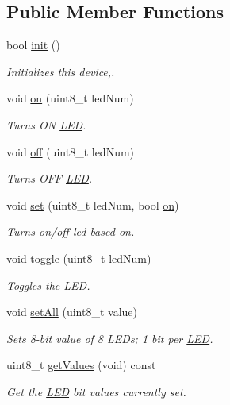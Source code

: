 \subsection*{Public Member Functions}
\begin{DoxyCompactItemize}
\item 
bool \hyperlink{classLED_a63962161aba1782dd879760c5960d6b5}{init} ()
\begin{DoxyCompactList}\small\item\em Initializes this device,. \end{DoxyCompactList}\item 
void \hyperlink{classLED_acc39ccc6387373b840912f21d62dc876}{on} (uint8\+\_\+t led\+Num)
\begin{DoxyCompactList}\small\item\em Turns ON \hyperlink{classLED}{L\+ED}. \end{DoxyCompactList}\item 
void \hyperlink{classLED_addf41e0b79325809d8cc12b792aaae97}{off} (uint8\+\_\+t led\+Num)
\begin{DoxyCompactList}\small\item\em Turns O\+FF \hyperlink{classLED}{L\+ED}. \end{DoxyCompactList}\item 
void \hyperlink{classLED_a31971293aa8763338871c9b2789cb606}{set} (uint8\+\_\+t led\+Num, bool \hyperlink{classLED_acc39ccc6387373b840912f21d62dc876}{on})
\begin{DoxyCompactList}\small\item\em Turns on/off led based on. \end{DoxyCompactList}\item 
void \hyperlink{classLED_aaf40ad52100d7bebb418a2b48bd5a5bf}{toggle} (uint8\+\_\+t led\+Num)
\begin{DoxyCompactList}\small\item\em Toggles the \hyperlink{classLED}{L\+ED}. \end{DoxyCompactList}\item 
void \hyperlink{classLED_a227f3bc652bf914afdeb3cbb73d1b927}{set\+All} (uint8\+\_\+t value)
\begin{DoxyCompactList}\small\item\em Sets 8-\/bit value of 8 L\+E\+Ds; 1 bit per \hyperlink{classLED}{L\+ED}. \end{DoxyCompactList}\item 
uint8\+\_\+t \hyperlink{classLED_a55aa5615bfa11cf5f127a08565a86796}{get\+Values} (void) const 
\begin{DoxyCompactList}\small\item\em Get the \hyperlink{classLED}{L\+ED} bit values currently set. \end{DoxyCompactList}\end{DoxyCompactItemize}
